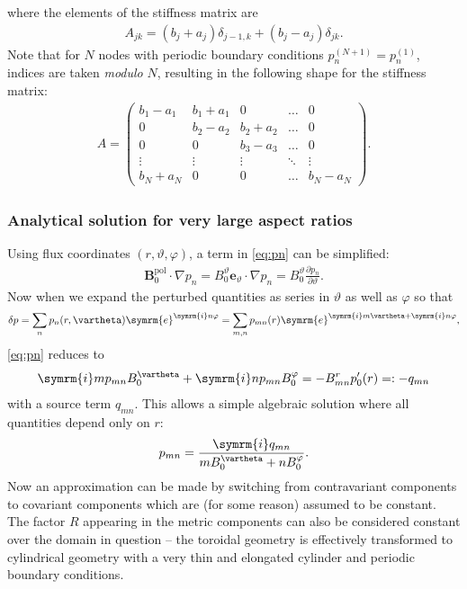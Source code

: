 \documentclass[a4paper, 10pt, english]{article}
\let\temp\vartheta
\let\vartheta\theta
\let\theta\temp
\let\temp\varphi
\let\varphi\phi
\let\phi\temp
\let\vec\symbf
\newcommand*\e{\ensuremath{\symrm{e}}}  %
\newcommand*\im{\ensuremath{\symrm{i}}}  %
\newcommand*\pd[2][]{\ensuremath{\frac{\partial #1}{\partial #2}}}  %
\newcommand*\pol{\ensuremath{\textrm{pol}}}  %
\begin{document}
where the elements of the stiffness matrix are
\begin{gather}
  A_{jk} = (b_{j} + a_{j}) \delta_{j-1, k} + (b_{j} - a_{j}) \delta_{jk}.
\end{gather}
Note that for $N$ nodes with periodic boundary conditions $p_{n}^{(N+1)} = p_{n}^{(1)}$, indices are taken \emph{modulo} $N$, resulting in the following shape for the stiffness matrix:
\begin{gather*}
  A = \begin{pmatrix}
    b_{1} - a_{1} &  b_{1} + a_{1} &        0       & \hdots &    0   \\
           0       & b_{2} - a_{2} &  b_{2} + a_{2} & \hdots &    0   \\
           0       &        0       & b_{3} - a_{3} & \hdots &    0   \\
        \vdots     &     \vdots     &     \vdots     & \ddots & \vdots \\
     b_{N} + a_{N} &        0       &        0       & \hdots & b_{N} - a_{N}
  \end{pmatrix}.
\end{gather*}

\subsubsection{Analytical solution for very large aspect ratios}

Using flux coordinates $(r, \theta, \phi)$, a term in \cref{eq:pn} can be simplified:
\begin{gather}
  \vec{B}_{0}^{\pol} \cdot \nabla p_{n} = B_{0}^{\theta} \vec{e}_{\theta} \cdot \nabla p_{n} = B_{0}^{\theta} \pd[p_{n}]{\theta}.
\end{gather}
Now when we expand the perturbed quantities as series in $\theta$ as well as $\phi$ so that
\begin{gather}
  \delta p = \sum_{n} p_n(r, \theta) \e^{\im n \phi} = \sum_{m, n} p_{mn}(r) \e^{\im m \theta + \im n \phi},
\end{gather}
\cref{eq:pn} reduces to
\begin{gather}
  \im m p_{mn} B_{0}^{\theta} + \im n p_{mn} B_{0}^{\phi} = -B_{mn}^{r} p_{0}'(r) =: -q_{mn}
\end{gather}
with a source term $q_{mn}$. This allows a simple algebraic solution where all quantities depend only on $r$:
\begin{gather}
  p_{mn} =  \frac{\im q_{mn}}{m B_{0}^{\theta} + n B_{0}^{\phi}}.
\end{gather}
Now an approximation can be made by switching from contravariant components to covariant components which are (for some reason) assumed to be constant. The factor $R$ appearing in the metric components can also be considered constant over the domain in question -- the toroidal geometry is effectively transformed to cylindrical geometry with a very thin and elongated cylinder and periodic boundary conditions.
\end{document}
